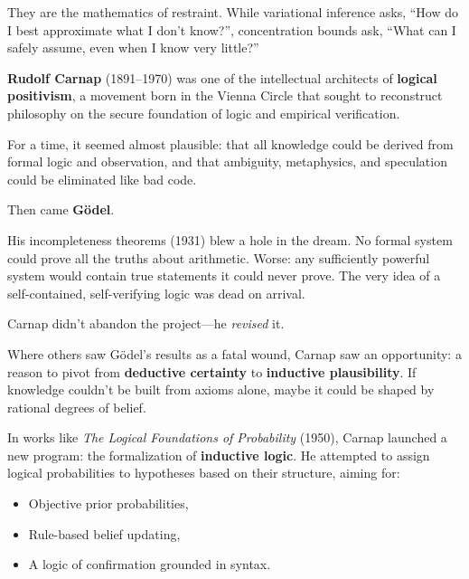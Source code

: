 They are the mathematics of restraint. While variational inference asks, ``How do I best approximate what I don’t know?'', concentration bounds ask, ``What can I safely assume, even when I know very little?''

\begin{tcolorbox}[colback=gray!5!white, colframe=black!75!white, title={Historical Sidebar: Carnap and the Collapse-Proof Dream of Inductive Logic}]

    \textbf{Rudolf Carnap} (1891–1970) was one of the intellectual architects of \textbf{logical positivism}, a movement born in the Vienna Circle that sought to reconstruct philosophy on the secure foundation of logic and empirical verification. 
    
    For a time, it seemed almost plausible: that all knowledge could be derived from formal logic and observation, and that ambiguity, metaphysics, and speculation could be eliminated like bad code.
    
    Then came \textbf{Gödel}.
    
    His incompleteness theorems (1931) blew a hole in the dream. No formal system could prove all the truths about arithmetic. Worse: any sufficiently powerful system would contain true statements it could never prove. The very idea of a self-contained, self-verifying logic was dead on arrival.
    
    Carnap didn’t abandon the project—he \textit{revised} it.
    
    \medskip
    
    Where others saw Gödel’s results as a fatal wound, Carnap saw an opportunity: a reason to pivot from \textbf{deductive certainty} to \textbf{inductive plausibility}. If knowledge couldn’t be built from axioms alone, maybe it could be shaped by rational degrees of belief.
    
    In works like \textit{The Logical Foundations of Probability} (1950), Carnap launched a new program: the formalization of \textbf{inductive logic}. He attempted to assign logical probabilities to hypotheses based on their structure, aiming for:
    
    \begin{itemize}
        \item Objective prior probabilities,
        \item Rule-based belief updating,
        \item A logic of confirmation grounded in syntax.
    \end{itemize}
    

\end{tcolorbox}
